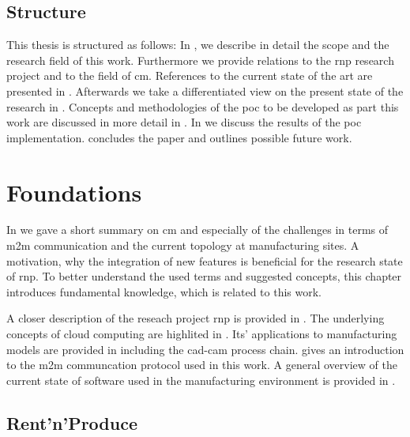 \documentclass[
a4paper,
twoside,
headsepline,
cleardoublepage=empty,
parskip=half,
draft=false
]{scrbook}
\begin{document}
	\newpage
			
		\section{Structure}
		
			This thesis is structured as follows: In , we describe in detail the scope and the research field of this work. 
			Furthermore we provide relations to the \gls{rnp} research project and to the field of \gls{cm}.
			References to the current state of the art are presented in .
			Afterwards we take a differentiated view on the present state of the research in .
			Concepts and methodologies of the \gls{poc} to be developed as part this work are discussed in more detail in .
			In  we discuss the results of the \gls{poc} implementation.
			 concludes the paper and outlines possible future work.
	
	\chapter{Foundations}\label{ch:foundations}
	
		In  we gave a short summary on \gls{cm} and especially of the challenges in terms of \gls{m2m} communication and the current topology at manufacturing sites.
		A motivation, why the integration of new features is beneficial for the research state of \gls{rnp}. 
		To better understand the used terms and suggested concepts, this chapter introduces fundamental knowledge, which is related to this work.
		
		A closer description of the reseach project \gls{rnp} is provided in .
		The underlying concepts of cloud computing are highlited in .
		Its' applications to manufacturing models are provided in  including the \gls{cad}-\gls{cam} process chain.
		 gives an introduction to the \gls{m2m} communcation protocol used in this work.
		A general overview of the current state of software used in the manufacturing environment is provided in .
	
		\section{Rent'n'Produce}\label{sec:rent_n_produce}
		
\end{document}
